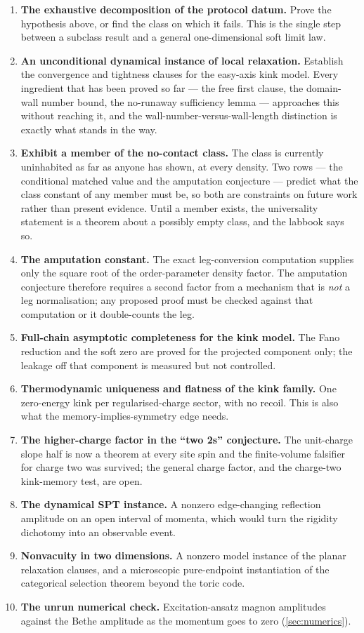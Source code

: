 \begin{enumerate}
  \item \textbf{The exhaustive decomposition of the protocol datum.} Prove the
    hypothesis above, or find the class on which it fails. This is the single
    step between a subclass result and a general one-dimensional soft limit
    law.
  \item \textbf{An unconditional dynamical instance of local relaxation.}
    Establish the convergence and tightness clauses for the easy-axis kink
    model. Every ingredient that has been proved so far --- the free first
    clause, the domain-wall number bound, the no-runaway sufficiency lemma ---
    approaches this without reaching it, and the wall-number-versus-wall-length
    distinction is exactly what stands in the way.
  \item \textbf{Exhibit a member of the no-contact class.} The class is
    currently uninhabited as far as anyone has shown, at every density. Two
    rows --- the conditional matched value and the amputation conjecture ---
    predict what the class constant of any member must be, so both are
    constraints on future work rather than present evidence. Until a member
    exists, the universality statement is a theorem about a possibly empty
    class, and the labbook says so.
  \item \textbf{The amputation constant.} The exact leg-conversion computation
    supplies only the square root of the order-parameter density factor. The
    amputation conjecture therefore requires a second factor from a mechanism
    that is \emph{not} a leg normalisation; any proposed proof must be checked
    against that computation or it double-counts the leg.
  \item \textbf{Full-chain asymptotic completeness for the kink model.} The
    Fano reduction and the soft zero are proved for the projected component
    only; the leakage off that component is measured but not controlled.
  \item \textbf{Thermodynamic uniqueness and flatness of the kink family.}
    One zero-energy kink per regularised-charge sector, with no recoil. This
    is also what the memory-implies-symmetry edge needs.
  \item \textbf{The higher-charge factor in the ``two 2s'' conjecture.} The
    unit-charge slope half is now a theorem at every site spin and the
    finite-volume falsifier for charge two was survived; the general charge
    factor, and the charge-two kink-memory test, are open.
  \item \textbf{The dynamical SPT instance.} A nonzero edge-changing
    reflection amplitude on an open interval of momenta, which would turn the
    rigidity dichotomy into an observable event.
  \item \textbf{Nonvacuity in two dimensions.} A nonzero model instance of the
    planar relaxation clauses, and a microscopic pure-endpoint instantiation
    of the categorical selection theorem beyond the toric code.
  \item \textbf{The unrun numerical check.} Excitation-ansatz magnon
    amplitudes against the Bethe amplitude as the momentum goes to zero
    (\cref{sec:numerics}).
\end{enumerate}

